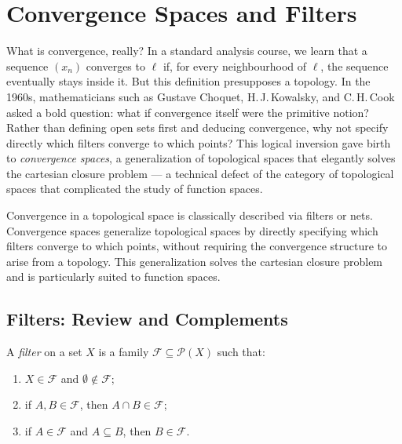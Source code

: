 \chapter{Convergence Spaces and Filters}
\label{ch:convergence}

What is convergence, really? In a standard analysis course, we learn that a sequence $(x_n)$ converges to $\ell$ if, for every neighbourhood of $\ell$, the sequence eventually stays inside it. But this definition presupposes a topology. In the 1960s, mathematicians such as Gustave Choquet, H.\,J.\,Kowalsky, and C.\,H.\,Cook asked a bold question: what if convergence itself were the primitive notion? Rather than defining open sets first and deducing convergence, why not specify directly which filters converge to which points? This logical inversion gave birth to \emph{convergence spaces}, a generalization of topological spaces that elegantly solves the cartesian closure problem --- a technical defect of the category of topological spaces that complicated the study of function spaces.

\begin{intuition}
Convergence in a topological space is classically described via filters or nets.
Convergence spaces generalize topological spaces by directly specifying which filters
converge to which points, without requiring the convergence structure to arise from a
topology. This generalization solves the cartesian closure problem and is particularly
suited to function spaces.
\end{intuition}

\section{Filters: Review and Complements}

\begin{definition}[Filter]
A \emph{filter} on a set $X$ is a family $\mathcal{F} \subseteq \mathcal{P}(X)$ such that:
\begin{enumerate}
  \item $X \in \mathcal{F}$ and $\emptyset \notin \mathcal{F}$;
  \item if $A, B \in \mathcal{F}$, then $A \cap B \in \mathcal{F}$;
  \item if $A \in \mathcal{F}$ and $A \subseteq B$, then $B \in \mathcal{F}$.
\end{enumerate}
\end{definition}

